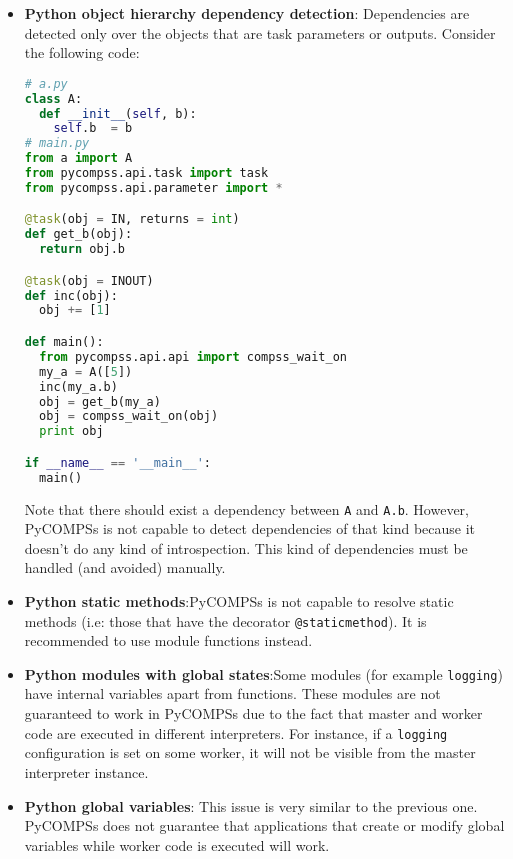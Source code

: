 \begin{itemize}
\item \textbf{Python object hierarchy dependency detection}: \newline Dependencies are detected only over the objects that are task 
parameters or outputs. Consider the following code:
\begin{lstlisting}[language=python]
# a.py
class A:
  def __init__(self, b):
    self.b  = b
# main.py
from a import A
from pycompss.api.task import task
from pycompss.api.parameter import *

@task(obj = IN, returns = int)
def get_b(obj):
  return obj.b

@task(obj = INOUT)
def inc(obj):
  obj += [1]

def main():
  from pycompss.api.api import compss_wait_on
  my_a = A([5])
  inc(my_a.b)
  obj = get_b(my_a)
  obj = compss_wait_on(obj)
  print obj

if __name__ == '__main__':
  main()            
\end{lstlisting}
Note that there should exist a dependency between \verb|A| and \verb|A.b|. However, PyCOMPSs is not capable
to detect dependencies of that kind because it doesn't do any kind of introspection. This kind of dependencies
must be handled (and avoided) manually.

\item \textbf{Python static methods}:\newline PyCOMPSs is not capable to resolve static methods (i.e: those that have the decorator
\verb|@staticmethod|). It is recommended to use module functions
instead.

\item \textbf{Python modules with global states}:\newline Some modules (for example \verb|logging|) have internal variables apart from functions. 
These modules are not guaranteed to work in PyCOMPSs due to the fact that master and worker code are executed in different interpreters. For instance, if a \verb|logging| configuration is set on some
worker, it will not be visible from the master interpreter instance.

\item \textbf{Python global variables}:\newline
This issue is very similar to the previous one. PyCOMPSs does not guarantee that applications that create or modify global variables while
worker code is executed will work.


\end{itemize}
